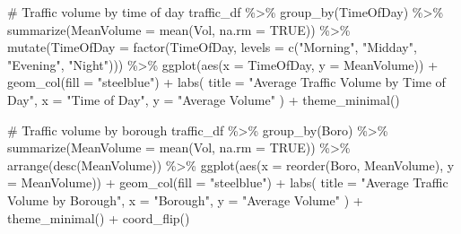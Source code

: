 \documentclass[
  letterpaper,
  DIV=11,
  numbers=noendperiod]{scrreprt}
\newenvironment{Shaded}{\begin{snugshade}}{\end{snugshade}}
\newcommand{\AttributeTok}[1]{\textcolor[rgb]{0.40,0.45,0.13}{#1}}
\newcommand{\CommentTok}[1]{\textcolor[rgb]{0.37,0.37,0.37}{#1}}
\newcommand{\ConstantTok}[1]{\textcolor[rgb]{0.56,0.35,0.01}{#1}}
\newcommand{\FunctionTok}[1]{\textcolor[rgb]{0.28,0.35,0.67}{#1}}
\newcommand{\NormalTok}[1]{\textcolor[rgb]{0.00,0.23,0.31}{#1}}
\newcommand{\SpecialCharTok}[1]{\textcolor[rgb]{0.37,0.37,0.37}{#1}}
\newcommand{\StringTok}[1]{\textcolor[rgb]{0.13,0.47,0.30}{#1}}
\begin{document}
\begin{Shaded}
\begin{Highlighting}[]
\CommentTok{\# Traffic volume by time of day}
\NormalTok{traffic\_df }\SpecialCharTok{\%\textgreater{}\%}
  \FunctionTok{group\_by}\NormalTok{(TimeOfDay) }\SpecialCharTok{\%\textgreater{}\%}
  \FunctionTok{summarize}\NormalTok{(}\AttributeTok{MeanVolume =} \FunctionTok{mean}\NormalTok{(Vol, }\AttributeTok{na.rm =} \ConstantTok{TRUE}\NormalTok{)) }\SpecialCharTok{\%\textgreater{}\%}
  \FunctionTok{mutate}\NormalTok{(}\AttributeTok{TimeOfDay =} \FunctionTok{factor}\NormalTok{(TimeOfDay, }\AttributeTok{levels =} \FunctionTok{c}\NormalTok{(}\StringTok{"Morning"}\NormalTok{, }\StringTok{"Midday"}\NormalTok{, }\StringTok{"Evening"}\NormalTok{, }\StringTok{"Night"}\NormalTok{))) }\SpecialCharTok{\%\textgreater{}\%}
  \FunctionTok{ggplot}\NormalTok{(}\FunctionTok{aes}\NormalTok{(}\AttributeTok{x =}\NormalTok{ TimeOfDay, }\AttributeTok{y =}\NormalTok{ MeanVolume)) }\SpecialCharTok{+}
  \FunctionTok{geom\_col}\NormalTok{(}\AttributeTok{fill =} \StringTok{"steelblue"}\NormalTok{) }\SpecialCharTok{+}
  \FunctionTok{labs}\NormalTok{(}
    \AttributeTok{title =} \StringTok{"Average Traffic Volume by Time of Day"}\NormalTok{,}
    \AttributeTok{x =} \StringTok{"Time of Day"}\NormalTok{,}
    \AttributeTok{y =} \StringTok{"Average Volume"}
\NormalTok{  ) }\SpecialCharTok{+}
  \FunctionTok{theme\_minimal}\NormalTok{()}

\CommentTok{\# Traffic volume by borough}
\NormalTok{traffic\_df }\SpecialCharTok{\%\textgreater{}\%}
  \FunctionTok{group\_by}\NormalTok{(Boro) }\SpecialCharTok{\%\textgreater{}\%}
  \FunctionTok{summarize}\NormalTok{(}\AttributeTok{MeanVolume =} \FunctionTok{mean}\NormalTok{(Vol, }\AttributeTok{na.rm =} \ConstantTok{TRUE}\NormalTok{)) }\SpecialCharTok{\%\textgreater{}\%}
  \FunctionTok{arrange}\NormalTok{(}\FunctionTok{desc}\NormalTok{(MeanVolume)) }\SpecialCharTok{\%\textgreater{}\%}
  \FunctionTok{ggplot}\NormalTok{(}\FunctionTok{aes}\NormalTok{(}\AttributeTok{x =} \FunctionTok{reorder}\NormalTok{(Boro, MeanVolume), }\AttributeTok{y =}\NormalTok{ MeanVolume)) }\SpecialCharTok{+}
  \FunctionTok{geom\_col}\NormalTok{(}\AttributeTok{fill =} \StringTok{"steelblue"}\NormalTok{) }\SpecialCharTok{+}
  \FunctionTok{labs}\NormalTok{(}
    \AttributeTok{title =} \StringTok{"Average Traffic Volume by Borough"}\NormalTok{,}
    \AttributeTok{x =} \StringTok{"Borough"}\NormalTok{,}
    \AttributeTok{y =} \StringTok{"Average Volume"}
\NormalTok{  ) }\SpecialCharTok{+}
  \FunctionTok{theme\_minimal}\NormalTok{() }\SpecialCharTok{+}
  \FunctionTok{coord\_flip}\NormalTok{()}
\end{Highlighting}
\end{Shaded}
\end{document}
